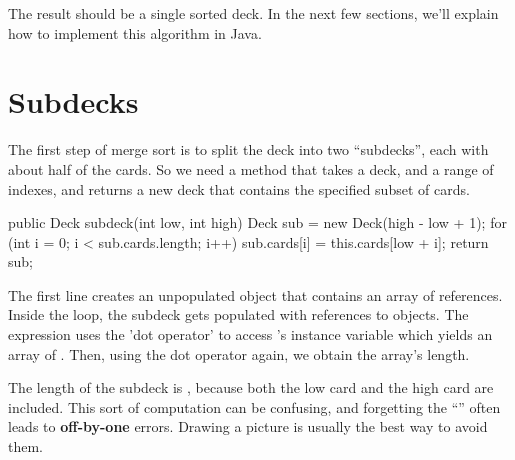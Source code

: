 
The result should be a single sorted deck.
In the next few sections, we'll explain how to implement this algorithm in Java.


\section{Subdecks}

\label{subdeck}

The first step of merge sort is to split the deck into two ``subdecks'', each with about half of the cards.
So we need a method that takes a deck, and a range of indexes, and returns a new deck that contains the specified subset of cards.

\begin{code}
public Deck subdeck(int low, int high) {
    Deck sub = new Deck(high - low + 1);
    for (int i = 0; i < sub.cards.length; i++) {
        sub.cards[i] = this.cards[low + i];
    }
    return sub;
}
\end{code}

The first line creates an unpopulated  object that contains an array of  references.
Inside the  loop, the subdeck gets populated with references to  objects.  
The expression  uses the 'dot operator' to access 's  instance variable which yields an array of .  Then, using the dot operator again, we obtain the array's length.


The length of the subdeck is , because both the low card and the high card are included.
This sort of computation can be confusing, and forgetting the ``'' often leads to {\bf off-by-one} errors.
Drawing a picture is usually the best way to avoid them.

%

